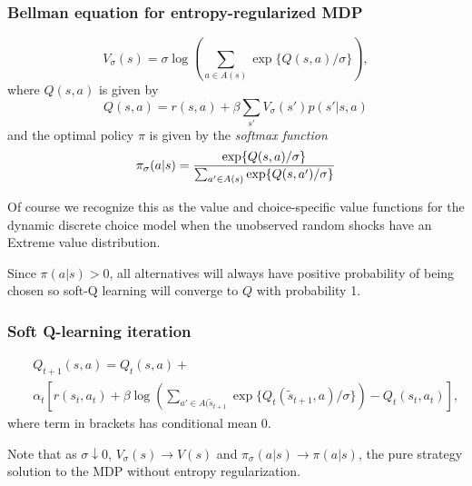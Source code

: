 \documentclass[10pt,english,t,handout]{beamer}
\begin{document}
\begin{frame} \frametitle{Bellman equation for entropy-regularized MDP}
$$  V_\sigma(s) = \sigma \log\left(\sum_{a \in A(s)} \exp\{ Q(s,a)/\sigma\}\right), $$
where $Q(s,a)$ is given by
$$  Q(s,a)=r(s,a)+ \beta \sum_{s'} V_\sigma(s')p(s'|s,a) $$
and the optimal policy $\pi$ is given by the {\it softmax function\/}
$$  \pi_\sigma(a|s) = { \exp\{Q(s,a)/\sigma\} \over \sum_{a' \in A(s)} \exp\{Q(s,a')/\sigma\}}  $$
\bi 
\item Of course we recognize this as the value and choice-specific value functions for the dynamic
discrete choice model when the unobserved random shocks have an Extreme value distribution.
\item Since $\pi(a|s) > 0$, all alternatives will always have positive probability of being chosen
so soft-Q learning will converge to $Q$ with probability 1.
\ei
\end{frame} 

\begin{frame} \frametitle{Soft Q-learning iteration}
\begin{eqnarray*} &&  Q_{t+1}(s,a) = Q_t(s,a)+ \\
 && \alpha_t \left[ r(s_t,a_t)+\beta \log\left(\sum_{a' \in A(\tilde s_{t+1}}
\exp\{ Q_t(\tilde s_{t+1},a)/\sigma\}\right)- Q_t(s_t,a_t)\right],  \end{eqnarray*}
where term in brackets has conditional mean 0.
\bi
\item Note that as $\sigma \downarrow 0$, $V_\sigma(s) \to V(s)$ and $\pi_\sigma(a|s) \to \pi(a|s)$, the
pure strategy solution to the MDP without entropy regularization.
\ei
\end{frame}
\end{document}
